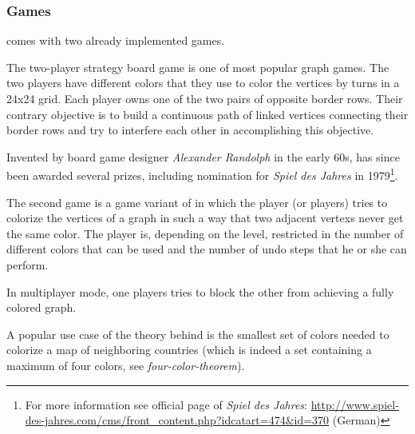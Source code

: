 \subsubsection{Games}
{\graphioli} comes with two already implemented games.\par
\textbf{\twixt}\par
The two-player strategy board game {\twixt} is one of most popular graph games. The two players have different colors that they use to color the vertices by turns in a 24x24 grid. Each player owns one of the two pairs of opposite border rows. Their contrary objective is to build a continuous \gls{path} of linked vertices connecting their border rows and try to interfere each other in accomplishing this objective.\par
Invented by board game designer \emph{Alexander Randolph} in the early 60s, {\twixt} has since been awarded several prizes, including nomination for \emph{Spiel des Jahres} in 1979\footnote{For more information see official page of \emph{Spiel des Jahres}: \url{http://www.spiel-des-jahres.com/cms/front_content.php?idcatart=474&id=370} (German)}.\par
\textbf{\graphcoloring}\par
The second game is a game variant of {\graphcoloring} in which the player (or players) tries to colorize the vertices of a graph in such a way that two \gls{adjacent} \glspl{vertex} never get the same color. The player is, depending on the level, restricted in the number of different colors that can be used and the number of \gls{undo} steps that he or she can perform.\par
In multiplayer mode, one players tries to block the other from achieving a fully colored graph.\par
A popular use case of the theory behind {\graphcoloring} is the smallest set of colors needed to colorize a map of neighboring countries (which is indeed a set containing a maximum of four colors, see \emph{\gls{four-color-theorem}}).\par